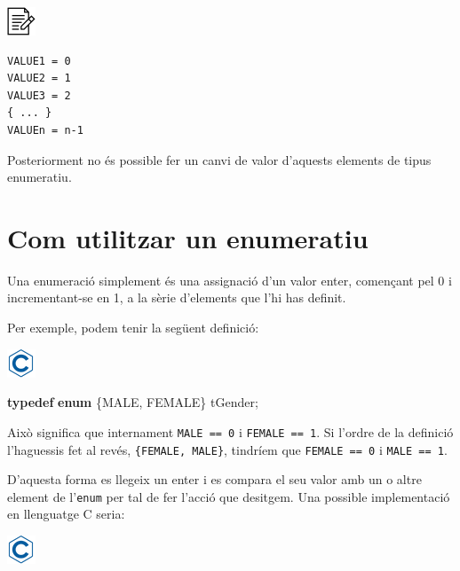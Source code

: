 \documentclass[]{book}
\newenvironment{Shaded}{\begin{snugshade}}{\end{snugshade}}
\newcommand{\KeywordTok}[1]{\textcolor[rgb]{0.13,0.29,0.53}{\textbf{#1}}}
\newcommand{\NormalTok}[1]{#1}
\begin{document}
\includegraphics{./img/alg.png}

\begin{verbatim}
VALUE1 = 0
VALUE2 = 1
VALUE3 = 2 
{ ... }
VALUEn = n-1
\end{verbatim}

Posteriorment no és possible fer un canvi de valor d'aquests elements de
tipus enumeratiu.

\section{Com utilitzar un enumeratiu}\label{com-utilitzar-un-enumeratiu}

Una enumeració simplement és una assignació d'un valor enter, començant
pel 0 i incrementant-se en 1, a la sèrie d'elements que l'hi has
definit.

Per exemple, podem tenir la següent definició:

\includegraphics{./img/c.png}

\begin{Shaded}
\begin{Highlighting}[]
\KeywordTok{typedef} \KeywordTok{enum}\NormalTok{ \{MALE, FEMALE\} tGender;}
\end{Highlighting}
\end{Shaded}

Això significa que internament \texttt{MALE\ ==\ 0} i
\texttt{FEMALE\ ==\ 1}. Si l'ordre de la definició l'haguessis fet al
revés, \texttt{\{FEMALE,\ MALE\}}, tindríem que \texttt{FEMALE\ ==\ 0} i
\texttt{MALE\ ==\ 1}.

D'aquesta forma es llegeix un enter i es compara el seu valor amb un o
altre element de l'\texttt{enum} per tal de fer l'acció que desitgem.
Una possible implementació en llenguatge C seria:

\includegraphics{./img/c.png}
\end{document}
